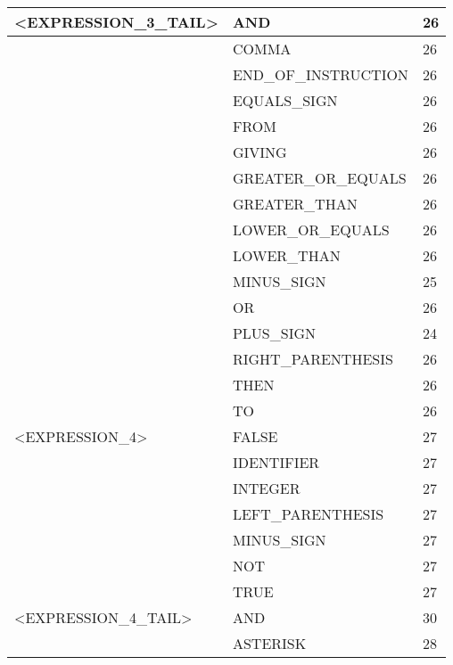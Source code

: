 \begin{longtable}{|l|l|l|}
<EXPRESSION\_3\_TAIL>                     &   AND                  &   26 \\ \hline
                     &   COMMA                &   26 \\ \hline
                     &   END\_OF\_INSTRUCTION &   26 \\ \hline
                     &   EQUALS\_SIGN         &   26 \\ \hline
                     &   FROM                 &   26 \\ \hline
                     &   GIVING               &   26 \\ \hline
                     &   GREATER\_OR\_EQUALS  &   26 \\ \hline
                     &   GREATER\_THAN        &   26 \\ \hline
                     &   LOWER\_OR\_EQUALS    &   26 \\ \hline
                     &   LOWER\_THAN          &   26 \\ \hline
                     &   MINUS\_SIGN          &   25 \\ \hline
                     &   OR                   &   26 \\ \hline
                     &   PLUS\_SIGN           &   24 \\ \hline
                     &   RIGHT\_PARENTHESIS   &   26 \\ \hline
                     &   THEN                 &   26 \\ \hline
                     &   TO                   &   26 \\ \hline
<EXPRESSION\_4>                          &   FALSE                &   27 \\ \hline
                     &   IDENTIFIER           &   27 \\ \hline
                     &   INTEGER              &   27 \\ \hline
                     &   LEFT\_PARENTHESIS    &   27 \\ \hline
                     &   MINUS\_SIGN          &   27 \\ \hline
                     &   NOT                  &   27 \\ \hline
                     &   TRUE                 &   27 \\ \hline
<EXPRESSION\_4\_TAIL>                     &   AND                  &   30 \\ \hline
                     &   ASTERISK             &   28 \\ \hline

\end{longtable}
